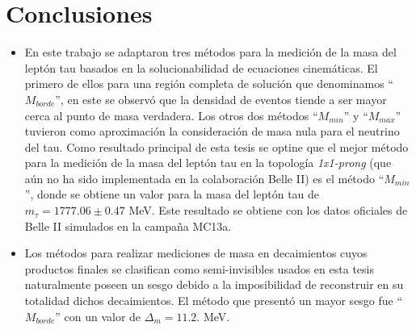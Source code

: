\chapter{Conclusiones}
\begin{itemize}
    \item En este trabajo se adaptaron tres métodos para la medición de la masa del leptón tau basados en la solucionabilidad de ecuaciones cinemáticas. El primero de ellos para una región completa de solución que denominamos ``\(M_{borde}\)'', en este se observó que la densidad de eventos tiende a ser mayor cerca al punto de masa verdadera. Los otros dos métodos ``\(M_{min}\)'' y ``\(M_{max}\)'' tuvieron como aproximación la consideración de masa nula para el neutrino del tau. Como resultado principal de esta tesis se optine que el mejor método para la medición de la masa del leptón tau en la topología \textit{1x1-prong} (que aún no ha sido implementada en la colaboración Belle II) es el método ``\(M_{min}\)'', donde se obtiene un valor para la masa del leptón tau de \(m_{\tau}=1777.06\pm0.47\) MeV. Este resultado se obtiene con los datos oficiales de Belle II simulados en la campaña MC13a.
    \item Los métodos para realizar mediciones de masa en decaimientos cuyos productos finales se clasifican como semi-invisibles usados en esta tesis naturalmente poseen un sesgo debido a la imposibilidad de reconstruir en su totalidad dichos decaimientos. El método que presentó un mayor sesgo fue ``\(M_{borde}\)'' con un valor de \(\Delta_{m}=11.2.\) MeV.
\end{itemize}
